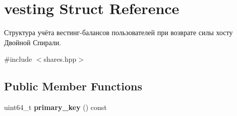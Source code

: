 \hypertarget{structvesting}{}\section{vesting Struct Reference}
\label{structvesting}


Структура учёта вестинг-\/балансов пользователей при возврате силы хосту Двойной Спирали.  




{\ttfamily \#include $<$shares.\+hpp$>$}

\subsection*{Public Member Functions}
\begin{DoxyCompactItemize}
\item 
\mbox{\label{structvesting_a35ede92a5445d2ab793b0bbbc18c5acb}} 
uint64\+\_\+t {\bfseries primary\+\_\+key} () const
\end{DoxyCompactItemize}
